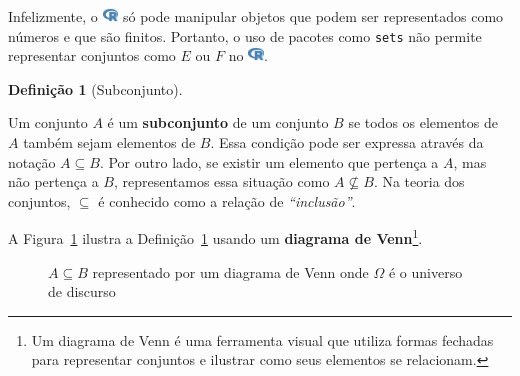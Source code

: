 \documentclass[
  letterpaper,
]{book}
\theoremstyle{definition}
\newtheorem{definition}{Definição}[chapter]
\theoremstyle{plain}
\theoremstyle{remark}
\begin{document}
Infelizmente, o
\includegraphics[width=1.13em,height=1em]{naive_set_theory_files/figure-pdf/fa-icon-9b00320707d42527dde67262afb33ded.pdf}
só pode manipular objetos que podem ser representados como números e que
são finitos. Portanto, o uso de pacotes como \texttt{sets} não permite
representar conjuntos como \(E\) ou \(F\) no
\includegraphics[width=1.13em,height=1em]{naive_set_theory_files/figure-pdf/fa-icon-9b00320707d42527dde67262afb33ded.pdf}.

\begin{definition}[Subconjunto]\protect\hypertarget{def-subset}{}\label{def-subset}

Um conjunto \(A\) é um \textbf{subconjunto} de um conjunto \(B\) se
todos os elementos de \(A\) também sejam elementos de \(B\). Essa
condição pode ser expressa através da notação \(A \subseteq B\). Por
outro lado, se existir um elemento que pertença a \(A\), mas não
pertença a \(B\), representamos essa situação como \(A \nsubseteq B\).
Na teoria dos conjuntos, \(\subseteq\) é conhecido como a relação de
\emph{``inclusão''}.

\end{definition}

A Figura~\ref{fig-subset-venn-diagram} ilustra a
Definição~\ref{def-subset} usando um \textbf{diagrama de
Venn}\footnote{Um diagrama de Venn é uma ferramenta visual que utiliza
  formas fechadas para representar conjuntos e ilustrar como seus
  elementos se relacionam.}.

\begin{figure}


\caption{\label{fig-subset-venn-diagram}\(A \subseteq B\) representado
por um diagrama de Venn onde \(\Omega\) é o universo de discurso}

\end{figure}%
\end{document}
